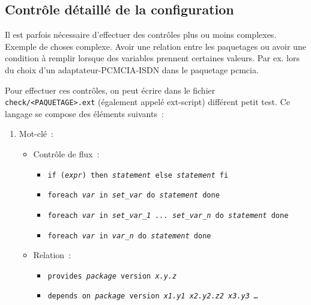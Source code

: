 \subsection{Contrôle détaillé de la configuration}

    Il est parfois nécessaire d'effectuer des contrôles plus ou moins complexes.
    Exemple de choses complexe. Avoir une relation entre les paquetages ou avoir
    une condition à remplir lorsque des variables prennent certaines valeurs.
    Par ex. lors du choix d’un adaptateur-PCMCIA-ISDN dans le paquetage \og{}pcmcia\fg{}.

    Pour effectuer ces contrôles, on peut écrire dans le fichier
    \texttt{check/<PAQUETAGE>.ext} (également appelé ext-script)
	différent petit test. Ce langage se compose des éléments suivants~:

    \begin{enumerate}
    \item Mot-clé~:

      \begin{itemize}
      \item Contrôle de flux~:

        \begin{itemize}
        \item \texttt{if (\textit{expr}) then \textit{statement} else \textit{statement} fi}
        \item \texttt{foreach \textit{var} in \textit{set\_var} do \textit{statement} done}
        \item \texttt{foreach \textit{var} in \textit{set\_var\_1 ... set\_var\_n} do \textit{statement} done}
        \item \texttt{foreach \textit{var} in \textit{var\_n} do \textit{statement} done}
        \end{itemize}

      \item
        Relation~:
        \begin{itemize}
        \item \texttt{provides \textit{package} version \textit{x.y.z}}
        \item \texttt{depends on \textit{package} version \textit{x1.y1 x2.y2.z2 x3.y3 \ldots}}
        \end{itemize}


\end{itemize}
\end{enumerate}
